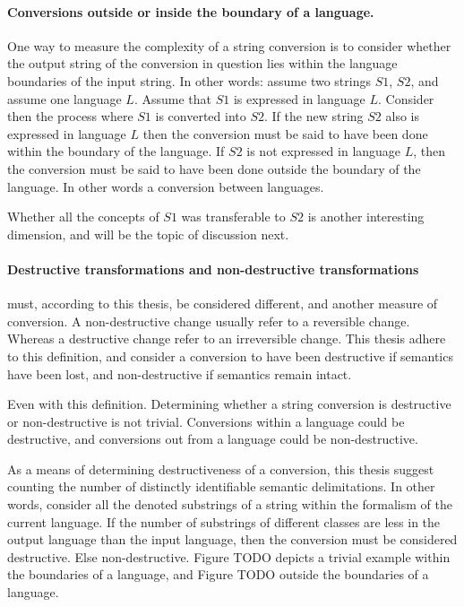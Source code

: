 \documentclass{scrreprt}
\begin{document}
\paragraph{Conversions outside or inside the boundary of a language.} One way to measure the complexity of a string conversion is to consider whether the output string of the conversion in question lies within the language boundaries of the input string. In other words: assume two strings $S1$, $S2$, and assume one language $L$. Assume that $S1$ is expressed in language $L$. Consider then the process where $S1$ is converted into $S2$. If the new string $S2$ also is expressed in language $L$ then the conversion must be said to have been done within the boundary of the language. If $S2$ is not expressed in language $L$, then the conversion must be said to have been done outside the boundary of the language. In other words a conversion between languages.

Whether all the concepts of $S1$ was transferable to $S2$ is another interesting dimension, and will be the topic of discussion next.


\paragraph{Destructive transformations and non-destructive transformations} must, according to this thesis, be considered different, and another measure of conversion. A non-destructive change usually refer to a reversible change. Whereas a destructive change refer to an irreversible change. This thesis adhere to this definition, and consider a conversion to have been destructive if semantics have been lost, and non-destructive if semantics remain intact.

Even with this definition. Determining whether a string conversion is destructive or non-destructive is not trivial. Conversions within a language could be destructive, and conversions out from a language could be non-destructive.

As a means of determining destructiveness of a conversion, this thesis suggest counting the number of distinctly identifiable semantic delimitations. In other words, consider all the denoted substrings of a string within the formalism of the current language. If the number of substrings of different classes are less in the output language than the input language, then the conversion must be considered destructive. Else non-destructive. Figure TODO depicts a trivial example within the boundaries of a language, and Figure TODO outside the boundaries of a language.
\end{document}
